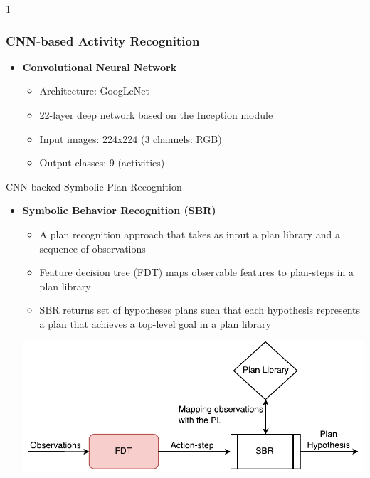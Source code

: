 \documentclass[usenames,dvipsnames]{beamer}
\def\masterclass{1}
\def\masterclass{0}
\begin{document}
\if\masterclass1
\begin{frame}[c]\frametitle{CNN-based Activity Recognition}
   	\begin{itemize}
   		\item \textbf{Convolutional Neural Network}
   		\begin{itemize}
   		    \item Architecture: GoogLeNet
			\item 22-layer deep network based on the Inception module
            \item Input images: 224x224 (3 channels: RGB)
            \item Output classes: 9 (activities)
	    \end{itemize}
		
	\end{itemize}
\end{frame}

\begin{frame}{CNN-backed Symbolic Plan Recognition}
   	\begin{itemize}
   		\item \textbf{Symbolic Behavior Recognition (SBR)}
   		\begin{itemize}
				\item A plan recognition approach that takes as input a plan library and a sequence of observations
                \item Feature decision tree (FDT) maps observable features to plan-steps in a plan library
                \item SBR returns set of hypotheses plans such that each hypothesis represents a plan that achieves a top-level goal in a plan library
	    \end{itemize}
		\begin{center}
			\includegraphics[width=0.7\linewidth]{fig/fdt.pdf}
		\end{center}
	\end{itemize}
\end{frame}
\end{document}
